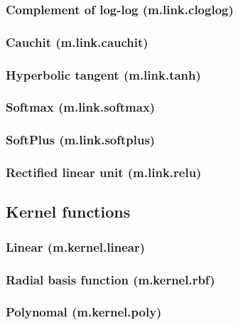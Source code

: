 \documentclass{article}
\theoremstyle{definition}
\begin{document}
\subsubsection{Complement of log-log (m.link.cloglog)}

\subsubsection{Cauchit (m.link.cauchit)}

\subsubsection{Hyperbolic tangent (m.link.tanh)}

\subsubsection{Softmax (m.link.softmax)}

\subsubsection{SoftPlus (m.link.softplus)}

\subsubsection{Rectified linear unit (m.link.relu)}

\subsection{Kernel functions}

\subsubsection{Linear (m.kernel.linear)}

\subsubsection{Radial basis function (m.kernel.rbf)}

\subsubsection{Polynomal (m.kernel.poly)}
\end{document}
